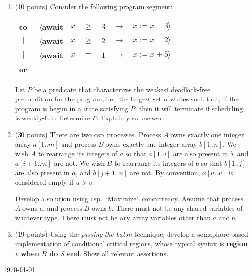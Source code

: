 \documentclass[12pt]{article}
\def\CSP{{\sc csp}}
\def\co{{\bf co}}
\def\oc{{\bf oc}}
\def\pbar{\parallel}
\def\lb{\langle}
\def\rb{\rangle}
\def\ra{\rightarrow}
\def\await{{\bf await}}
\begin{document}
\begin{enumerate}
\begin{enumerate}
\end{enumerate}

\newpage
\item (10 points)
Consider the following program segment:\\

{\parskip=0mm
\begin{tabular}{llllllll}
\co\    & $\lb $\await & $x$ & $\geq$ & $ 3 $ & $\ra$ & $ x := x - 3 \rb$\\
$\pbar$ & $\lb $\await & $x$ & $\geq$ & $ 2 $ & $\ra$ & $ x := x - 2 \rb$\\
$\pbar$ & $\lb $\await & $x$ & $ =  $ & $ 1 $ & $\ra$ & $ x := x + 5 \rb$\\
\oc\\
\end{tabular}
}

Let $P$ be a predicate that characterizes the weakest deadlock-free
precondition for the program, i.e., the largest set of states such
that, if the program is begun in a state satisfying $P$, then it will
terminate if scheduling is weakly-fair.  Determine $P$.  Explain your
answer.



\item (30 points)
There are two \CSP\ processes.  Process $A$ owns exactly one integer array
$a[1..m]$ and process $B$ owns exactly one integer array $b[1..n]$.
We wish $A$ to rearrange its integers of $a$ so that $a[1..i]$ are
also present in $b$, and $a[i+1..m]$ are not.  We wish $B$ to
rearrange its integers of $b$ so that $b[1..j]$ are also present in
$a$, and $b[j+1..n]$ are not.  By convention, $x[u..v]$ is considered
empty if $u > v$.

Develop a solution using \CSP.  ``Maximize'' concurrency.  Assume that
process $A$ owns $a$, and process $B$ owns $b$.  There must not be any
shared variables of whatever type.  There must not be any array
variables other than $a$ and $b$.


\item (19 points)
Using the {\em passing the baton} technique, develop a semaphore-based
implementation of conditional critical regions, whose typical syntax
is {\bf region $v$ when $B$ do $S$ end}.  Show all relevant
assertions.


\end{enumerate}
\vfill{\hfill\tiny\today}\\
\end{document}
